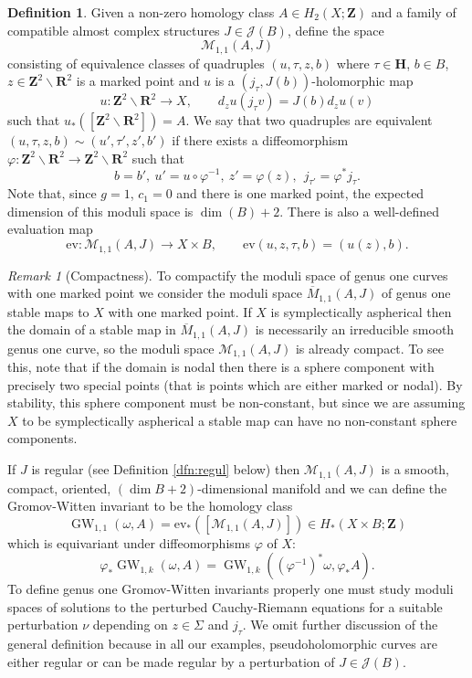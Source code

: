 \documentclass[11pt]{amsart}
\newcommand{\mM}{\mathcal{M}}
\newcommand{\HH}{\mathbf{H}}
\newcommand{\RR}{\mathbf{R}}
\newcommand{\ZZ}{\mathbf{Z}}
\newcommand{\ev}{\mathrm{ev}}
\newcommand{\GW}{\operatorname{GW}}
\newcommand{\torus}{\ZZ^2\backslash\RR^2}
\renewcommand{\phi}{\varphi}
\newcommand{\OP}{\operatorname}
\numberwithin{equation}{section}
\theoremstyle{definition}
\newtheorem{dfn}[equation]{Definition}
\theoremstyle{remark}
\newtheorem{rmk}[equation]{Remark}
\begin{document}
\begin{dfn}
Given a non-zero homology class $A\in H_2(X;\ZZ)$ and a family of compatible almost complex structures $J\in\mathcal{J}(B)$, define the space
\[\mM_{1,1}(A,J)\]
consisting of equivalence classes of quadruples $(u,\tau,z,b)$ where $\tau\in\HH$, $b\in B$, $z\in\torus$ is a marked point and $u$ is a $(j_{\tau},J(b))$-holomorphic map
\[u\colon\torus\to X,\qquad d_zu(j_{\tau}v)=J(b)d_zu(v)\]
such that $u_*([\torus])=A$. We say that two quadruples are equivalent $(u,\tau,z,b)\sim(u',\tau',z',b')$ if there exists a diffeomorphism $\varphi\colon\torus\to\torus$ such that
\[b=b',\ u'=u\circ\varphi^{-1},\ z'=\varphi(z),\ \ j_{\tau'}=\varphi^*j_{\tau}.\]
Note that, since $g=1$, $c_1=0$ and there is one marked point, the expected dimension of this moduli space is $\dim(B)+2$. There is also a well-defined evaluation map
\[\ev\colon\mM_{1,1}(A,J)\to X\times B,\qquad\ev(u,z,\tau,b)=(u(z),b).\]
\end{dfn}
\begin{rmk}[Compactness]\label{rmk:compactification}
To compactify the moduli space of genus one curves with one marked point we consider the moduli space $\overline{M}_{1,1}(A,J)$ of genus one stable maps to $X$ with one marked point. If $X$ is symplectically aspherical then the domain of a stable map in $\overline{M}_{1,1}(A,J)$ is necessarily an irreducible smooth genus one curve, so the moduli space $\mM_{1,1}(A,J)$ is already compact. To see this, note that if the domain is nodal then there is a sphere component with precisely two special points (that is points which are either marked or nodal). By stability, this sphere component must be non-constant, but since we are assuming $X$ to be symplectically aspherical a stable map can have no non-constant sphere components.
\end{rmk}
If $J$ is regular (see Definition \ref{dfn:regul} below) then $\mM_{1,1}(A,J)$ is a smooth, compact, oriented, $(\dim B+2)$-dimensional manifold and we can define the Gromov-Witten invariant to be the homology class
\begin{equation}\label{dfn:gw}\OP{GW}_{1,1}(\omega,A)=\ev_*([\mM_{1,1}(A,J)])\in H_*(X\times B;\ZZ)\end{equation}
which is equivariant under diffeomorphisms $\phi$ of $X$:
\begin{equation}\label{gwequi}\phi_*\GW_{1,k}(\omega,A)=\GW_{1,k}((\phi^{-1})^*\omega,\phi_*A).\end{equation}
To define genus one Gromov-Witten invariants properly \cite{RT2} one must study moduli spaces of solutions to the perturbed Cauchy-Riemann equations for a suitable perturbation $\nu$ depending on $z\in\Sigma$ and $j_{\tau}$. We omit further discussion of the general definition because in all our examples, pseudoholomorphic curves are either regular or can be made regular by a perturbation of $J\in\mathcal{J}(B)$.
\end{document}
